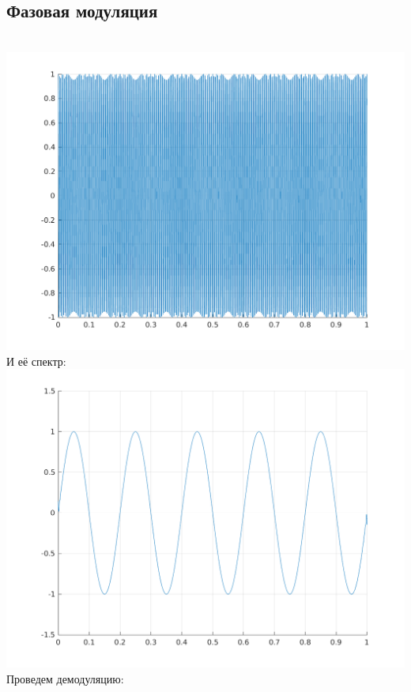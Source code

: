 \documentclass[a4paper]{article}
\begin{document}
\subsection{Фазовая модуляция}
\\
\includegraphics[scale=0.7]{lab5/figures/figure_1.png}\\
И её спектр:\\
\includegraphics[scale=0.7]{lab5/figures/figure_2.png}\\
\newpage
Проведем демодуляцию:
\\
\end{document}
